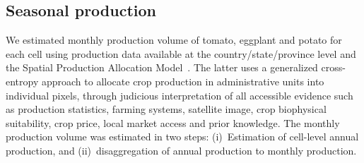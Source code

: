 \documentclass[10pt]{article}
\theoremstyle{definition}
\begin{document}

\subsection{Seasonal production}\label{sec:prod} 
We estimated monthly production volume of tomato, eggplant and potato for
each cell using production data available at the country/state/province
level and the Spatial Production Allocation Model~\cite{spam}. The latter
uses a generalized cross-entropy approach to allocate crop production in
administrative units into individual pixels, through judicious
interpretation of all accessible evidence such as production statistics,
farming systems, satellite image, crop biophysical suitability, crop price,
local market access and prior knowledge. The monthly production volume was
estimated in two steps: (i)~Estimation of cell-level annual production, and
(ii)~disaggregation of annual production to monthly production.
\end{document}
